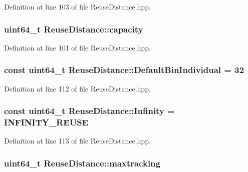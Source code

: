 Definition at line 103 of file ReuseDistance.hpp.

\hypertarget{class_reuse_distance_a8e3536264e92460f10455af7f1e161fd}{
\subsubsection[{capacity}]{\setlength{\rightskip}{0pt plus 5cm}uint64\_\-t {\bf ReuseDistance::capacity}}}
\label{class_reuse_distance_a8e3536264e92460f10455af7f1e161fd}


Definition at line 101 of file ReuseDistance.hpp.

\hypertarget{class_reuse_distance_af0d9cba7105109e89ae6b7177f54c976}{
\subsubsection[{DefaultBinIndividual}]{\setlength{\rightskip}{0pt plus 5cm}const uint64\_\-t {\bf ReuseDistance::DefaultBinIndividual} = 32}}
\label{class_reuse_distance_af0d9cba7105109e89ae6b7177f54c976}


Definition at line 112 of file ReuseDistance.hpp.

\hypertarget{class_reuse_distance_a59f7f0ac6ad014472537619394ac7375}{
\subsubsection[{Infinity}]{\setlength{\rightskip}{0pt plus 5cm}const uint64\_\-t {\bf ReuseDistance::Infinity} = INFINITY\_\-REUSE}}
\label{class_reuse_distance_a59f7f0ac6ad014472537619394ac7375}


Definition at line 113 of file ReuseDistance.hpp.

\hypertarget{class_reuse_distance_ac3e8daa6fa8c16cdf955fd6cf99ba932}{
\subsubsection[{maxtracking}]{\setlength{\rightskip}{0pt plus 5cm}uint64\_\-t {\bf ReuseDistance::maxtracking}}}
\label{class_reuse_distance_ac3e8daa6fa8c16cdf955fd6cf99ba932}


